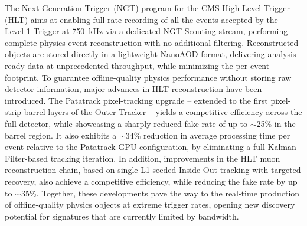The Next-Generation Trigger (NGT) program for the CMS High-Level Trigger (HLT) aims at enabling full-rate recording of all the events accepted by the Level-1 Trigger at \SI{750}{\kilo\hertz} via a dedicated NGT Scouting stream, performing complete physics event reconstruction with no additional filtering.
  Reconstructed objects are stored directly in a lightweight NanoAOD format, delivering analysis-ready data at unprecedented throughput, while minimizing the per-event footprint.
  To guarantee offline-quality physics performance without storing raw detector information, major advances in HLT reconstruction have been introduced.
  The Patatrack pixel-tracking upgrade -- extended to the first pixel-strip barrel layers of the Outer Tracker -- yields a competitive efficiency across the full detector, while showcasing a sharply reduced fake rate of up to $\sim$25\% in the barrel region.
  It also exhibits a $\sim$34\% reduction in average processing time per event relative to the Patatrack GPU configuration, by eliminating a full Kalman-Filter-based tracking iteration.
  In addition, improvements in the HLT muon reconstruction chain, based on single L1-seeded Inside-Out tracking with targeted recovery, also achieve a competitive efficiency, while reducing the fake rate by up to $\sim$35\%.
  Together, these developments pave the way to the real-time production of offline-quality physics objects at extreme trigger rates, opening new discovery potential for signatures that are currently limited by bandwidth.
